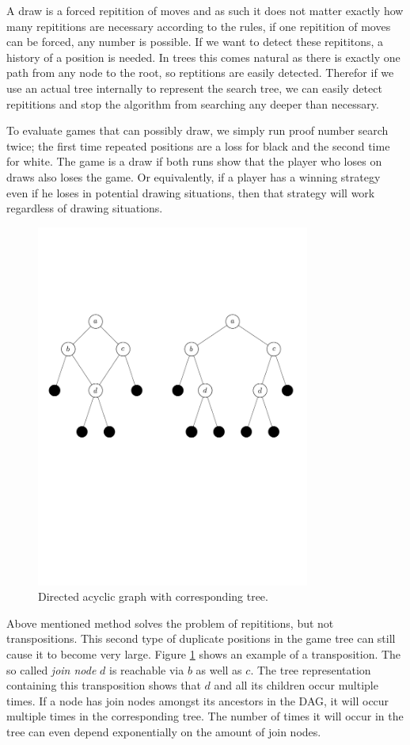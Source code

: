 \documentclass{article}
\begin{document}
A draw is a forced repitition of moves and as such it does not matter exactly how many repititions are necessary according to the rules,
if one repitition of moves can be forced, any number is possible. If we want to detect these repititons, a history of a position is needed. In trees this
comes natural as there is exactly one path from any node to the root, so reptitions are easily detected. Therefor if we use an actual tree internally
to represent the search tree, we can easily detect repititions and stop the algorithm from searching any deeper than necessary.

To evaluate games that can possibly draw, we simply run proof number search twice; the first time repeated positions are a loss for black and the second time for white.
The game is a draw if both runs show that the player who loses on draws also loses the game. Or equivalently, if a player has a winning strategy
even if he loses in potential drawing situations, then that strategy will work regardless of drawing situations.\\

\begin{figure}
\center
\includegraphics[trim = 0mm 10cm 0cm 0cm, clip, width=9cm]{treevsgraph.pdf}
\caption{Directed acyclic graph with corresponding tree.}
\label{treevsgraph}
\end{figure}

Above mentioned method solves the problem of repititions, but not transpositions. This second type of duplicate positions in the game tree
can still cause it to become very large. Figure \ref{treevsgraph} shows an example of a transposition. The so called \emph{join node} $d$ is
reachable via $b$ as well as $c$. The tree representation containing this transposition shows that $d$ and all its children occur multiple times.
If a node has join nodes amongst its ancestors in the DAG, it will
occur multiple times in the corresponding tree. The number of times it will occur in the tree can even depend exponentially on the amount of join
nodes.
\end{document}
